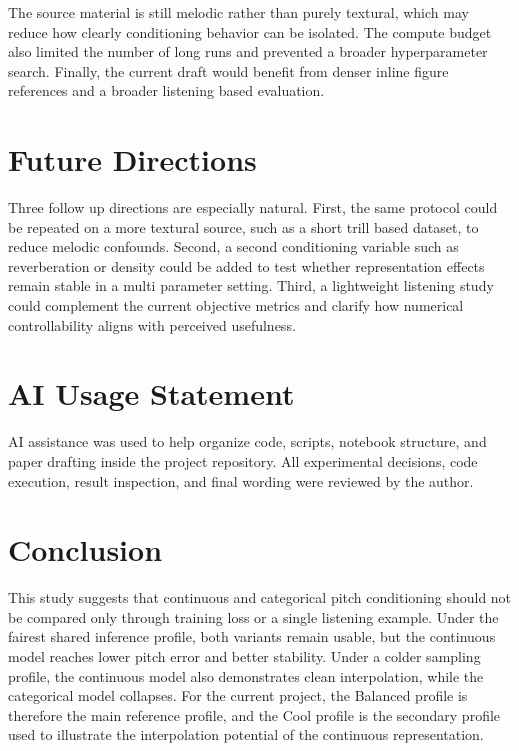 \documentclass{article}
\begin{document}
The source material is still melodic rather than purely textural, which may reduce how clearly conditioning behavior can be isolated. The compute budget also limited the number of long runs and prevented a broader hyperparameter search. Finally, the current draft would benefit from denser inline figure references and a broader listening based evaluation.

\section{Future Directions}\label{sec:future_directions}

Three follow up directions are especially natural. First, the same protocol could be repeated on a more textural source, such as a short trill based dataset, to reduce melodic confounds. Second, a second conditioning variable such as reverberation or density could be added to test whether representation effects remain stable in a multi parameter setting. Third, a lightweight listening study could complement the current objective metrics and clarify how numerical controllability aligns with perceived usefulness.

\section{AI Usage Statement}\label{sec:ai_usage}

AI assistance was used to help organize code, scripts, notebook structure, and paper drafting inside the project repository. All experimental decisions, code execution, result inspection, and final wording were reviewed by the author.

\section{Conclusion}\label{sec:conclusion}

This study suggests that continuous and categorical pitch conditioning should not be compared only through training loss or a single listening example. Under the fairest shared inference profile, both variants remain usable, but the continuous model reaches lower pitch error and better stability. Under a colder sampling profile, the continuous model also demonstrates clean interpolation, while the categorical model collapses. For the current project, the Balanced profile is therefore the main reference profile, and the Cool profile is the secondary profile used to illustrate the interpolation potential of the continuous representation.



\end{document}
